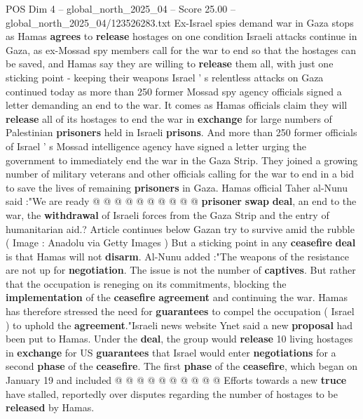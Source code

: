 \begin{textsample}{POS Dim 4 – global\_north\_2025\_04 – Score 25.00 – global\_north\_2025\_04/123526283.txt}  \label{ex:f4_pos_223}
Ex-Israel spies demand war in Gaza stops as Hamas \textbf{agrees} to \textbf{release} hostages on one condition Israeli attacks continue in Gaza, as ex-Mossad spy members call for the war to end so that the hostages can be saved, and Hamas say they are willing to \textbf{release} them all, with just one sticking point - keeping their weapons Israel ' s relentless attacks on Gaza continued today as more than 250 former Mossad spy agency officials signed a letter demanding an end to the war.
It comes as Hamas officials claim they will \textbf{release} all of its hostages to end the war in \textbf{exchange} for large numbers of Palestinian \textbf{prisoners} held in Israeli \textbf{prisons}.
And more than 250 former officials of Israel ' s Mossad intelligence agency have signed a letter urging the government to immediately end the war in the Gaza Strip.
They joined a growing number of military veterans and other officials calling for the war to end in a bid to save the lives of remaining \textbf{prisoners} in Gaza.
Hamas official Taher al-Nunu said :"We are ready @ @ @ @ @ @ @ @ @ @ \textbf{prisoner} \textbf{swap} \textbf{deal}, an end to the war, the \textbf{withdrawal} of Israeli forces from the Gaza Strip and the entry of humanitarian aid.?
Article continues below Gazan try to survive amid the rubble ( Image : Anadolu via Getty Images ) But a sticking point in any \textbf{ceasefire} \textbf{deal} is that Hamas will not \textbf{disarm}.
Al-Nunu added :"The weapons of the resistance are not up for \textbf{negotiation}.
The issue is not the number of \textbf{captives}.
But rather that the occupation is reneging on its commitments, blocking the \textbf{implementation} of the \textbf{ceasefire} \textbf{agreement} and continuing the war.
Hamas has therefore stressed the need for \textbf{guarantees} to compel the occupation ( Israel ) to uphold the \textbf{agreement}."Israeli news website Ynet said a new \textbf{proposal} had been put to Hamas.
Under the \textbf{deal}, the group would \textbf{release} 10 living hostages in \textbf{exchange} for US \textbf{guarantees} that Israel would enter \textbf{negotiations} for a second \textbf{phase} of the \textbf{ceasefire}.
The first \textbf{phase} of the \textbf{ceasefire}, which began on January 19 and included @ @ @ @ @ @ @ @ @ @ Efforts towards a new \textbf{truce} have stalled, reportedly over disputes regarding the number of hostages to be \textbf{released} by Hamas.

\end{textsample}
